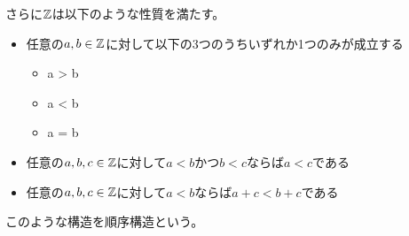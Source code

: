 \documentclass[uplatex, 11pt, a4j, dvipdfmx]{jsarticle}
\begin{document}
    さらに$\mathbb{Z}$は以下のような性質を満たす。
    \begin{itemize}
      \item 任意の$a, b \in \mathbb{Z}$に対して以下の3つのうちいずれか1つのみが成立する
        \begin{itemize}
          \item a > b
          \item a < b
          \item a = b
        \end{itemize}
      \item 任意の$a, b, c \in \mathbb{Z}$に対して$a < b$かつ$b < c$ならば$a < c$である
      \item 任意の$a, b, c \in \mathbb{Z}$に対して$a < b$ならば$a + c < b + c$である
    \end{itemize}

    このような構造を順序構造という。
\end{document}
